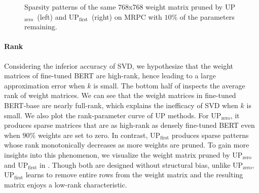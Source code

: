 \begin{figure}[t]
	\centering
	\caption{Sparsity patterns of the same 768x768 weight matrix  pruned by UP$_\text{zero}$~(left) and UP$_\text{first}$~(right) on MRPC with $10\%$ of
the parameters remaining.}
	\label{fig:pattern}
\end{figure}

\paragraph{Rank} 
Considering the inferior accuracy of SVD, we hypothesize that the weight matrices of fine-tuned BERT are high-rank, 
hence leading to a large approximation error when $k$ is small. The bottom half of  inspects the average rank of weight matrices. We can see that the weight matrices in fine-tuned BERT-base are nearly full-rank, which explains the inefficacy of SVD when $k$ is small. We also plot the rank-parameter curve of UP methods. For UP$_\text{zero}$, it produces sparse matrices that are 
as high-rank as densely fine-tuned BERT even when $90\%$ weights are set to zero. In contrast, UP$_\text{first}$  produces sparse patterns whose rank monotonically decreases as more weights are pruned. To gain more insights into this phenomenon, we visualize the weight matrix pruned by UP$_\text{zero}$ and UP$_\text{first}$ in . Though both are designed without structural bias,  unlike UP$_\text{zero}$, UP$_\text{first}$ learns to remove entire rows from the weight matrix and 
the resulting matrix enjoys a low-rank characteristic.



